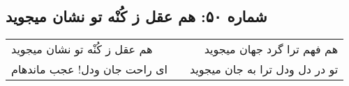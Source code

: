 \begin{center}
\section*{شماره ۵۰: هم عقل ز کُنْه تو نشان میجوید}
\label{sec:050}
\begin{longtable}{l p{0.5cm} r}
هم عقل ز کُنْه تو نشان میجوید
&&
هم فهم ترا گرد جهان میجوید
\\
ای راحت جان ودل! عجب ماندهام
&&
تو در دل ودل ترا به جان میجوید
\\
\end{longtable}
\end{center}
